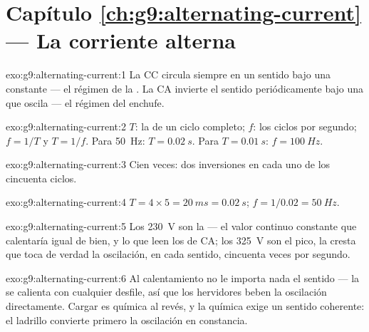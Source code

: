 \section*{Capítulo \ref{ch:g9:alternating-current} --- La corriente alterna}

\begin{solution}{exo:g9:alternating-current:1}
La CC circula siempre en un sentido bajo una  constante ---
el régimen de la . La CA invierte el sentido periódicamente
bajo una  que oscila --- el régimen del enchufe.
\end{solution}

\begin{solution}{exo:g9:alternating-current:2}
$T$: la  de un ciclo completo; $f$: los ciclos por
segundo; $f = 1/T$ y $T = 1/f$. Para \qty{50}{Hz}: $T =
\qty{0.02}{s}$. Para $T = \qty{0.01}{s}$: $f = \qty{100}{Hz}$.
\end{solution}

\begin{solution}{exo:g9:alternating-current:3}
Cien veces: dos inversiones en cada uno de los cincuenta ciclos.
\end{solution}

\begin{solution}{exo:g9:alternating-current:4}
$T = 4 \times 5 = \qty{20}{ms} = \qty{0.02}{s}$; $f = 1/0.02 =
\qty{50}{Hz}$.
\end{solution}

\begin{solution}{exo:g9:alternating-current:5}
Los \qty{230}{V} son la  --- el valor continuo
constante que calentaría igual de bien, y lo que leen los
 de CA; los \qty{325}{V} son el pico, la cresta que
toca de verdad la oscilación, en cada sentido, cincuenta veces por
segundo.
\end{solution}

\begin{solution}{exo:g9:alternating-current:6}
Al calentamiento no le importa nada el sentido --- la  se
calienta con cualquier desfile, así que los hervidores beben la
oscilación directamente. Cargar es química al revés, y la química exige
un sentido coherente: el ladrillo convierte primero la oscilación en
constancia.
\end{solution}

